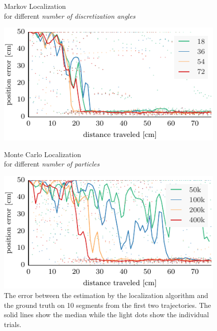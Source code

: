 \documentclass[letterpaper, 10pt, conference]{ieeeconf}
\begin{document}
\begin{figure}

\begin{center}
Markov Localization\\for different \emph{number of discretization angles}
\end{center}
\includegraphics{ml-small_runs_random_12-xy}

\vspace{.3em}

\begin{center}
Monte Carlo Localization\\for different \emph{number of particles}
\end{center}
\includegraphics{mcl-small_runs_random_12-xy}

\caption{%
The error between the estimation by the localization algorithm and the ground truth on 10 segments from the first two trajectories.
The solid lines show the median while the light dots show the individual trials.}
\label{fig:small-runs}
\end{figure}
\end{document}
